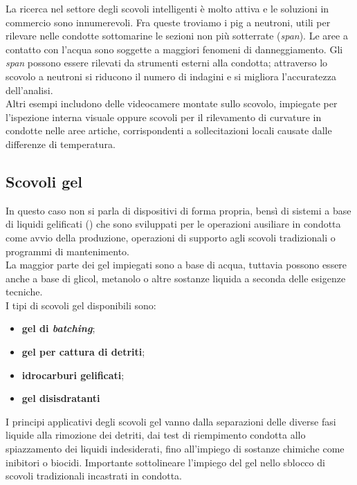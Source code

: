 La ricerca nel settore degli scovoli intelligenti è molto attiva e le soluzioni in commercio sono innumerevoli. Fra queste troviamo i pig a neutroni, utili per rilevare nelle condotte sottomarine le sezioni non più sotterrate (\textit{span}). Le aree a contatto con l'acqua sono soggette a maggiori fenomeni di danneggiamento. 
Gli \textit{span} possono essere rilevati da strumenti esterni alla condotta; attraverso lo scovolo a neutroni si riducono il numero di indagini e si migliora l'accuratezza dell'analisi.\\
Altri esempi includono delle videocamere montate sullo scovolo, impiegate per l'ispezione interna visuale oppure scovoli per il rilevamento di curvature in condotte nelle aree artiche, corrispondenti a sollecitazioni locali causate dalle differenze di temperatura.

\subsection{Scovoli gel}
In questo caso non si parla di dispositivi di forma propria, bensì di sistemi a base di liquidi gelificati () che sono sviluppati per le operazioni ausiliare in condotta come avvio della produzione, operazioni di supporto agli scovoli tradizionali o programmi di mantenimento.\\
La maggior parte dei gel impiegati sono a base di acqua, tuttavia possono essere anche a base di glicol, metanolo o altre sostanze liquida a seconda delle esigenze tecniche.\\
I tipi di scovoli gel disponibili sono:
\begin{itemize}
	\item \textbf{gel di \textit{batching}};
	\item \textbf{gel per cattura di detriti};
	\item \textbf{idrocarburi gelificati};
	\item \textbf{gel disisdratanti}
\end{itemize}

I principi applicativi degli scovoli gel vanno dalla separazioni delle diverse fasi liquide alla rimozione dei detriti, dai test di riempimento condotta allo spiazzamento dei liquidi indesiderati, fino all'impiego di sostanze chimiche come inibitori o biocidi. Importante sottolineare l'impiego del gel nello sblocco di scovoli tradizionali incastrati in condotta.

